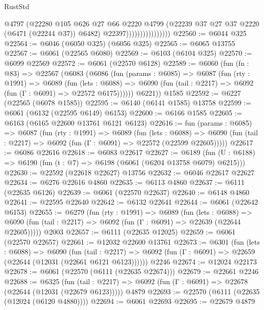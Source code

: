\begin{lexlean}{RustStd}
\begin{coremodule}
{\begin{coremodule}
{{{{{{{{{{{{{{{{{{{{{{{{{{                                  @4797
                                  (@22280
                                    @105
                                    @626
                                    @27
                                    @66
                                    @2220
                                    @4799
                                    (@22239 @37 @27 @37 @2220 (@6471 (@22244 @37)) @6482)
                                    @22397))))))))))))))))
@22560 := @6044 @325
@22564 := @6046 (@6050 @325) (@6056 @325)
@22565 := @6065 @13755
@22567 := @6061 (@22565 @6080)
@22569 := @6103 (@6104 @325)
@22570 := @6099 @22569
@22572 := @6061 (@22570 @6128)
@22589 := @6060
    (fun (fn : @83) =>
    @22567
      (@6083
        (@6086
          (fun (params : @6085) =>
          @6087
            (fun (rty : @1991) =>
            @6089
              (fun (lets : @6088) =>
              @6090 (fun (tail : @2217) => @6092 (fun (Γ : @6091) => @22572 @6175))))))
        @6221))
    @1585
@22592 := @6227 (@22565 (@6078 @1585))
@22595 := @6140 (@6141 @1585) @13758
@22599 := @6061 (@6132 (@22595 @6149) @6153)
@22600 := @6166 @1585
@22605 := @6163 (@6165 @22600 @13761 @6121 @6123)
@22616 := fun (params : @6085) =>
  @6087
    (fun (rty : @1991) =>
    @6089
      (fun (lets : @6088) =>
      @6090 (fun (tail : @2217) => @6092 (fun (Γ : @6091) => @22572 (@22599 @22605)))))
@22617 := @6086 @22616
@22618 := @6083 @22617
@22627 := @6189
    (fun (U : @6188) => @6190 (fun (t : @7) => @6198 (@6061 (@6204 @13758 @6079) @6215)))
@22630 := @22592 (@22618 @22627) @13756
@22632 := @6046 @22617 @22627
@22634 := @6276 @22616 @4860
@22635 := @6113 @4860
@22637 := @6111 (@22635 @6126)
@22639 := @6061 (@22570 @22637)
@22640 := @6148 @4860
@22641 := @22595 @22640
@22642 := @6132 @22641
@22644 := @6061 (@22642 @6153)
@22655 := @6279
    (fun (rty : @1991) =>
    @6089
      (fun (lets : @6088) =>
      @6090 (fun (tail : @2217) => @6092 (fun (Γ : @6091) => @22639 (@22644 @22605)))))
    @2003
@22657 := @6111 (@22635 @12025)
@22659 := @6061 (@22570 @22657)
@22661 := @12032 @22600 @13761
@22673 := @6301
    (fun (lets : @6088) =>
    @6090
      (fun (tail : @2217) =>
      @6092 (fun (Γ : @6091) => @22659 (@22644 (@12031 (@22661 @6121 @6123))))))
    @2246
@22674 := @12024 @22173
@22678 := @6061 (@22570 (@6111 (@22635 @22674)))
@22679 := @22661 @2246
@22688 := @6325
    (fun (tail : @2217) => @6092 (fun (Γ : @6091) => @22678 (@22644 (@12031 (@22679 @6123)))))
    @4879
@22693 := @22570 (@6111 (@22635 (@12024 (@6120 @4880))))
@22694 := @6061 @22693
@22695 := @22679 @4879
}}}}}}}}}}}}}}}}}}}}}}}}}}
\end{coremodule}}
\end{coremodule}
\end{lexlean}
